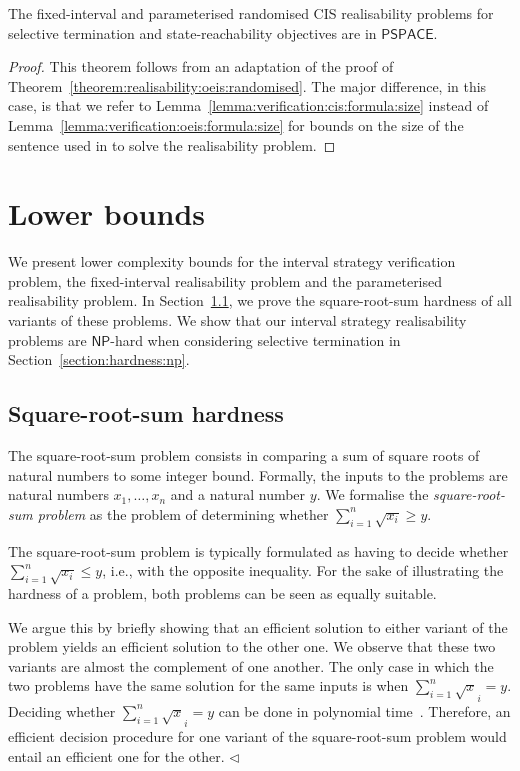\documentclass[a4paper,UKenglish,cleveref,autoref,thm-restate,colorlinks]{lipics-v2021}
\newcommand{\pspace}{\textsf{PSPACE}}
\newcommand{\np}{\textsf{NP}}
\newcommand{\sqsx}{x} \newcommand{\sqsxVect}{\bar{x}} \newcommand{\sqsm}{m} \newcommand{\sqsy}{y} \newcommand{\sqsi}{i} \newcommand{\sqsn}{n} \newcommand{\sqsSize}{E}
\begin{document}
\begin{theorem}\label{theorem:realisability:cis:randomised}
  The fixed-interval and parameterised randomised CIS realisability problems for selective termination and state-reachability objectives are in $\pspace$.
\end{theorem}
\begin{proof}
  This theorem follows from an adaptation of the proof of Theorem~\ref{theorem:realisability:oeis:randomised}.
  The major difference, in this case, is that we refer to Lemma~\ref{lemma:verification:cis:formula:size} instead of Lemma~\ref{lemma:verification:oeis:formula:size} for bounds on the size of the sentence used in to solve the realisability problem.
\end{proof}

 
\section{Lower bounds}\label{section:hardness}
We present lower complexity bounds for the interval strategy verification problem, the fixed-interval realisability problem and the parameterised realisability problem.
In Section~\ref{section:hardness:sqs}, we prove the square-root-sum hardness of all variants of these problems.
We show that our interval strategy realisability problems are $\np$-hard when considering selective termination in Section~\ref{section:hardness:np}.

\subsection{Square-root-sum hardness}\label{section:hardness:sqs}
The square-root-sum problem consists in comparing a sum of square roots of natural numbers to some integer bound.
Formally, the inputs to the problems are natural numbers $\sqsx_1, \ldots, \sqsx_\sqsn$ and a natural number $\sqsy$.
We formalise the \textit{square-root-sum problem} as the problem of determining whether $\sum_{\sqsi=1}^\sqsn\sqrt{\sqsx_\sqsi}\geq\sqsy$.

\begin{remark}
  The square-root-sum problem is typically formulated as having to decide whether $\sum_{\sqsi=1}^\sqsn\sqrt{\sqsx_\sqsi}\leq\sqsy$, i.e., with the opposite inequality.
  For the sake of illustrating the hardness of a problem, both problems can be seen as equally suitable.

  We argue this by briefly showing that an efficient solution to either variant of the problem yields an efficient solution to the other one.
  We observe that these two variants are almost the complement of one another.
  The only case in which the two problems have the same solution for the same inputs is when $\sum_{\sqsi=1}^\sqsn\sqrt{\sqsx}_\sqsi= \sqsy$.
  Deciding whether $\sum_{\sqsi=1}^\sqsn\sqrt{\sqsx}_\sqsi= \sqsy$ can be done in polynomial time~\cite{DBLP:journals/jsc/BorodinFHT85}. Therefore, an efficient decision procedure for one variant of the square-root-sum problem would entail an efficient one for the other.
  \hfill$\lhd$
\end{remark}
\end{document}
